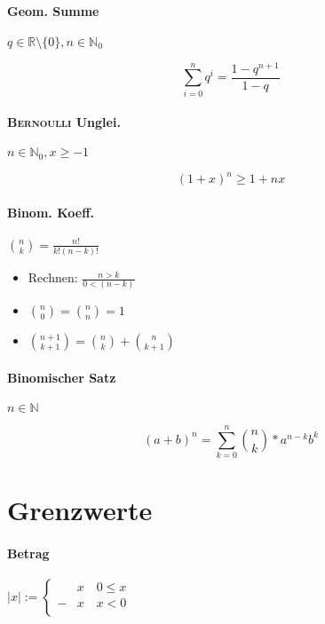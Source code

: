 \begin{mzImportant}

  \paragraph{Geom. Summe} $q \in \mathbb{R} \setminus \{ 0 \}, n \in \mathbb{N}_0$

  $$\sum_{i=0}^n q^i = \frac{1 - q^{n+1}}{1 - q}$$

  \paragraph{\textsc{Bernoulli} Unglei.} $n \in \mathbb{N}_0, x \geq -1$

  $$(1 + x)^n \geq 1 + nx$$

  \paragraph{Binom. Koeff.} $\binom{n}{k} = \frac{n!}{k! (n - k)!}$
\end{mzImportant}

\begin{itemize}
  \item Rechnen: $\frac{n > k}{0 < (n - k)}$

  \item $\binom{n}{0} = \binom{n}{n} = 1$

  \item $\binom{n + 1}{k + 1} = \binom{n}{k} + \binom{n}{k + 1}$
\end{itemize}

\paragraph{Binomischer Satz} $n \in \mathbb{N}$

\begin{mzImportant}
  $$(a + b)^n = \sum_{k=0}^n \binom{n}{k} * a^{n - k} b^k$$
\end{mzImportant}

\section{Grenzwerte}

\paragraph{Betrag} $|x| := \begin{cases}
      & x \quad 0 \leq x \\
    - & x \quad x < 0    \\
  \end{cases}$

